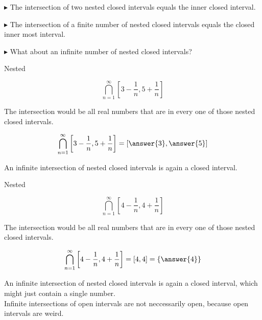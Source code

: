 \documentclass{ximera}
\begin{document}
$\blacktriangleright$  The intersection of two nested closed intervals equals the inner closed interval.

$\blacktriangleright$  The intersection of a finite number of nested closed intervals equals the closed inner most interval.

$\blacktriangleright$ What about an infinite number of nested closed intervals?



\begin{example} Nested


\[ \bigcap_{n=1}^{\infty}   \left[3 - \frac{1}{n}, 5 + \frac{1}{n}\right]     \]



The intersection would be all real numbers that are in every one of those nested closed intervals.


\[ \bigcap_{n=1}^{\infty}   \left[3 - \frac{1}{n}, 5 + \frac{1}{n}\right]  = \left[\answer{3}, \answer{5}\right]   \]





\end{example} 


An infinite intersection of nested closed intervals is again a closed interval. \\






\begin{example} Nested


\[ \bigcap_{n=1}^{\infty}   \left[4 - \frac{1}{n}, 4 +  \frac{1}{n}\right]     \]



The intersection would be all real numbers that are in every one of those nested closed intervals.


\[ \bigcap_{n=1}^{\infty}   \left[4 -  \frac{1}{n}, 4 + \frac{1}{n}\right]    = [4, 4] = \left\{ \answer{4} \right\}  \]





\end{example}


An infinite intersection of nested closed intervals is again a closed interval, which might just contain a single number. \\





Infinite intersections of open intervals are not neccessarily open, because open intervals are weird.
\end{document}
